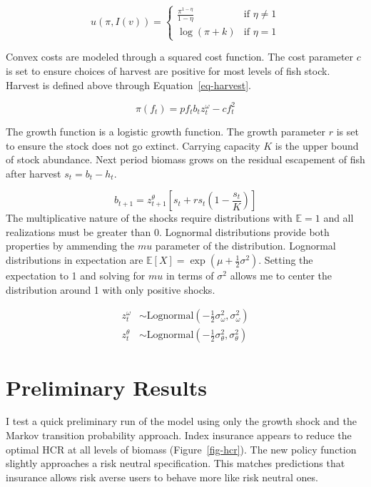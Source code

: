 \documentclass[
  letterpaper,
  DIV=11,
  numbers=noendperiod]{scrartcl}
\begin{document}
\[
u(\pi,I(v))=\begin{cases}
\frac{\pi^{1-\eta}}{1-\eta} & \text{if } \eta\neq 1 \\
\log(\pi+k) & \text{if } \eta=1
\end{cases}
\]

Convex costs are modeled through a squared cost function. The cost
parameter \(c\) is set to ensure choices of harvest are positive for
most levels of fish stock. Harvest is defined above through
Equation~\ref{eq-harvest}.

\[
\pi(f_t)=p f_t b_tz^\omega_t - c f_t^2
\]

The growth function is a logistic growth function. The growth parameter
\(r\) is set to ensure the stock does not go extinct. Carrying capacity
\(K\) is the upper bound of stock abundance. Next period biomass grows
on the residual escapement of fish after harvest \(s_t=b_t-h_t\).

\[
b_{t+1}=z_{t+1}^\theta \left[s_t+ r s_t(1-\frac{s_t}{K})\right]
\] The multiplicative nature of the shocks require distributions with
\(\mathbb{E}=1\) and all realizations must be greater than 0. Lognormal
distributions provide both properties by ammending the \(mu\) parameter
of the distribution. Lognormal distributions in expectation are
\(\mathbb{E}[X]=\exp(\mu+\frac{1}{2}\sigma^2)\). Setting the expectation
to 1 and solving for \(mu\) in terms of \(\sigma^2\) allows me to center
the distribution around 1 with only positive shocks.

\[
\begin{aligned}
z_t^\omega &\sim \text{Lognormal}(-\frac{1}{2}\sigma^2_\omega,\sigma^2_\omega) \\
z_t^\theta &\sim \text{Lognormal}(-\frac{1}{2}\sigma^2_\theta,\sigma^2_\theta)
\end{aligned}
\]

\hypertarget{sec-res}{%
\section{Preliminary Results}\label{sec-res}}

I test a quick preliminary run of the model using only the growth shock
and the Markov transition probability approach. Index insurance appears
to reduce the optimal HCR at all levels of biomass
(Figure~\ref{fig-hcr}). The new policy function slightly approaches a
risk neutral specification. This matches predictions that insurance
allows risk averse users to behave more like risk neutral ones.
\end{document}
